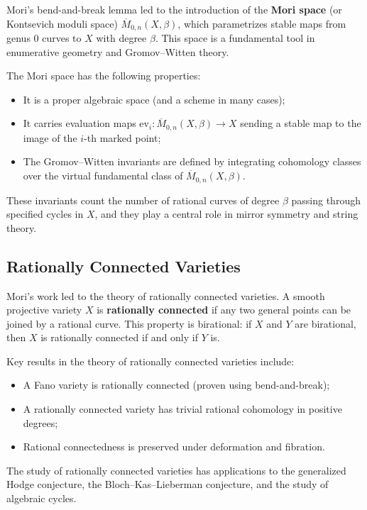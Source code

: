 Mori's bend-and-break lemma led to the introduction of the \textbf{Mori space}
(or Kontsevich moduli space) $\overline{M}_{0,n}(X, \beta)$, which parametrizes
stable maps from genus 0 curves to $X$ with degree $\beta$. This space is a
fundamental tool in enumerative geometry and Gromov--Witten theory.

The Mori space has the following properties:
\begin{itemize}
    \item It is a proper algebraic space (and a scheme in many cases);
    \item It carries evaluation maps $\text{ev}_i: \overline{M}_{0,n}(X, \beta) \to X$
    sending a stable map to the image of the $i$-th marked point;
    \item The Gromov--Witten invariants are defined by integrating cohomology
    classes over the virtual fundamental class of $\overline{M}_{0,n}(X, \beta)$.
\end{itemize}

These invariants count the number of rational curves of degree $\beta$ passing
through specified cycles in $X$, and they play a central role in mirror symmetry
and string theory.

\subsection*{Rationally Connected Varieties}

Mori's work led to the theory of rationally connected varieties. A smooth
projective variety $X$ is \textbf{rationally connected} if any two general
points can be joined by a rational curve. This property is birational: if $X$
and $Y$ are birational, then $X$ is rationally connected if and only if $Y$
is.

Key results in the theory of rationally connected varieties include:
\begin{itemize}
    \item A Fano variety is rationally connected (proven using bend-and-break);
    \item A rationally connected variety has trivial rational cohomology in
    positive degrees;
    \item Rational connectedness is preserved under deformation and fibration.
\end{itemize}

The study of rationally connected varieties has applications to the
generalized Hodge conjecture, the Bloch--Kas--Lieberman conjecture, and the
study of algebraic cycles.

